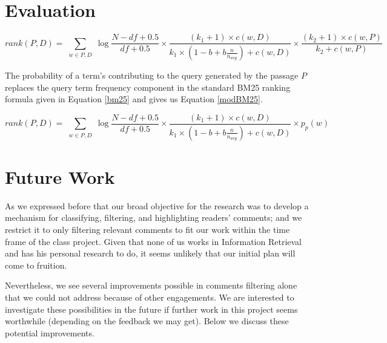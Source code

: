 \documentclass[article]{IEEEtran}
\begin{document}
\section{Evaluation}
\label{ev}

\begin{widetext}
\begin{equation}
\label{bm25}
rank(P,D) = \sum_{\substack{w \in P,D}}\log{\frac{N - df + 0.5}{df + 0.5}} \times 
{\frac{(k_1 + 1) \times c(w, D)}{k_1 \times (1 - b + b \frac{n}{n_{avg}}) + c(w,D)}} \times
\frac{(k_2 + 1) \times {c(w, P)}}{k_2 + c(w, P)}
\end{equation}
\end{widetext}

The probability of a term's contributing to the query generated by the passage $P$ replaces the query term frequency component in the standard BM25 ranking formula given in Equation \ref{bm25} and gives us Equation \ref{modBM25}. 

\begin{widetext}
\begin{equation}
\label{modBM25}
rank(P,D) = \sum_{\substack{w \in P,D}}\log{\frac{N - df + 0.5}{df + 0.5}} \times 
{\frac{(k_1 + 1) \times c(w, D)}{k_1 \times (1 - b + b \frac{n}{n_{avg}}) + c(w,D)}} \times p_p(w)
\end{equation}
\end{widetext}

\section{Future Work}
\label{fw}
As we expressed before that our broad objective for the research was to develop a mechanism for classifying, filtering, and highlighting readers' comments; and we restrict it to only filtering relevant comments to fit our work within the time frame of the class project. Given that none of us works in Information Retrieval and has his personal research to do, it seems unlikely that our initial plan will come to fruition.

Nevertheless, we see several improvements possible in comments filtering alone that we could not address because of other engagements. We are interested to investigate these possibilities in the future if further work in this project seems worthwhile (depending on the feedback we may get). Below we discuss these potential improvements.       
\end{document}
